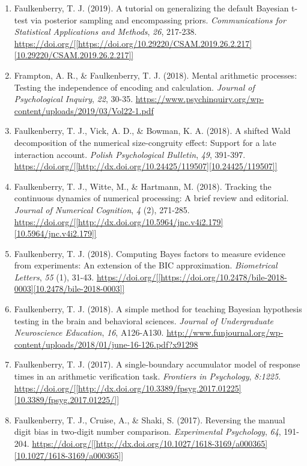 \documentclass[article,10pt]{article}
\begin{document}
\begin{enumerate}
\item Faulkenberry, T. J. (2019). A tutorial on generalizing the default Bayesian t-test via posterior sampling and encompassing priors. \emph{Communications for Statistical Applications and Methods}, \emph{26}, 217-238. \url{https://doi.org/[[https://doi.org/10.29220/CSAM.2019.26.2.217][10.29220/CSAM.2019.26.2.217]]}
\item Frampton, A. R., \& Faulkenberry, T. J. (2018). Mental arithmetic processes: Testing the independence of encoding and calculation. \emph{Journal of Psychological Inquiry}, \emph{22}, 30-35. \url{https://www.psychinquiry.org/wp-content/uploads/2019/03/Vol22-1.pdf}
\item Faulkenberry, T. J., Vick, A. D., \& Bowman, K. A. (2018). A shifted Wald decomposition of the numerical size-congruity effect: Support for a late interaction account. \emph{Polish Psychological Bulletin}, \emph{49}, 391-397. \url{https://doi.org/[[http://dx.doi.org/10.24425/119507][10.24425/119507]]}
\item Faulkenberry, T. J., Witte, M., \& Hartmann, M. (2018). Tracking the continuous dynamics of numerical processing: A brief review and editorial. \emph{Journal of Numerical Cognition}, \emph{4} (2), 271-285. \url{https://doi.org/[[http://dx.doi.org/10.5964/jnc.v4i2.179][10.5964/jnc.v4i2.179]]}
\item Faulkenberry, T. J. (2018). Computing Bayes factors to measure evidence from experiments: An extension of the BIC approximation. \emph{Biometrical Letters}, \emph{55} (1), 31-43. \url{https://doi.org/[[https://doi.org/10.2478/bile-2018-0003][10.2478/bile-2018-0003]]}
\item Faulkenberry, T. J. (2018). A simple method for teaching Bayesian hypothesis testing in the brain and behavioral sciences. \emph{Journal of Undergraduate Neuroscience Education}, \emph{16}, A126-A130. \url{http://www.funjournal.org/wp-content/uploads/2018/01/june-16-126.pdf?x91298}
\item Faulkenberry, T. J. (2017). A single-boundary accumulator model of response times in an arithmetic verification task. \emph{Frontiers in Psychology}, \emph{8:1225}. \url{https://doi.org/[[http://dx.doi.org/10.3389/fpsyg.2017.01225][10.3389/fpsyg.2017.01225/]]}
\item Faulkenberry, T. J., Cruise, A., \& Shaki, S. (2017). Reversing the manual digit bias in two-digit number comparison. \emph{Experimental Psychology}, \emph{64}, 191-204. \url{https://doi.org/[[http://dx.doi.org/10.1027/1618-3169/a000365][10.1027/1618-3169/a000365]]}

\end{enumerate}
\end{document}

